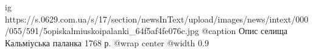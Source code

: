  
 
 
 
 

\ifcmt
  ig https://s.0629.com.ua/s/17/section/newsInText/upload/images/news/intext/000/055/591/5opiskalmiuskoipalanki_64f5af4fe076c.jpg
	@caption Опис селища Кальміуська паланка 1768 р.
  @wrap center
  @width 0.9
\fi
